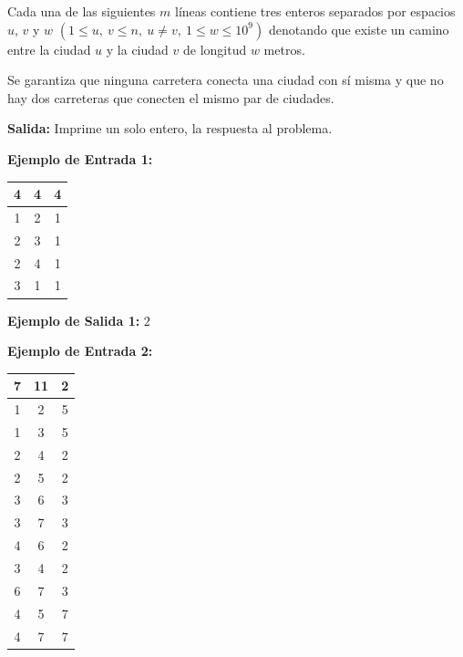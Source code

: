 \documentclass[12pt]{article}
\newcommand{\nl}{\vspace{0.3cm}}
\begin{document}
\nl

Cada una de las siguientes $m$ líneas contiene tres enteros separados por espacios $u$, $v$ y $w$ $ ( 1 \leqslant u,\ v \leqslant n,\ u \neq v,\ 1 \leqslant w \leqslant 10^9 ) $ denotando que existe un camino entre la ciudad $u$ y la ciudad $v$ de longitud $w$ metros.

\nl

Se garantiza que ninguna carretera conecta una ciudad con sí misma y que no hay dos carreteras que conecten el mismo par de ciudades.

\nl

\textbf{Salida:} Imprime un solo entero, la respuesta al problema.

\nl

\textbf{Ejemplo de Entrada 1:}

\nl

\begin{tabular}{|c|c|c|}
	\hline 4 & 4 & 4 \\ 
	\hline 1 & 2 & 1 \\ 
	\hline 2 & 3 & 1 \\ 
	\hline 2 & 4 & 1 \\ 
	\hline 3 & 1 & 1 \\ 
	\hline 
\end{tabular} 

\nl

\textbf{Ejemplo de Salida 1:} $2$

\nl

\textbf{Ejemplo de Entrada 2:}

\nl

\begin{tabular}{|c|c|c|}
	\hline 7 & 11 & 2 \\ 
	\hline 1 & 2 & 5 \\ 
	\hline 1 & 3 & 5 \\ 
	\hline 2 & 4 & 2 \\ 
	\hline 2 & 5 & 2 \\ 
	\hline 3 & 6 & 3 \\ 
	\hline 3 & 7 & 3 \\ 
	\hline 4 & 6 & 2 \\ 
	\hline 3 & 4 & 2 \\ 
	\hline 6 & 7 & 3 \\ 
	\hline 4 & 5 & 7 \\ 
	\hline 4 & 7 & 7 \\ 
	\hline 
\end{tabular} 

\nl
\end{document}
